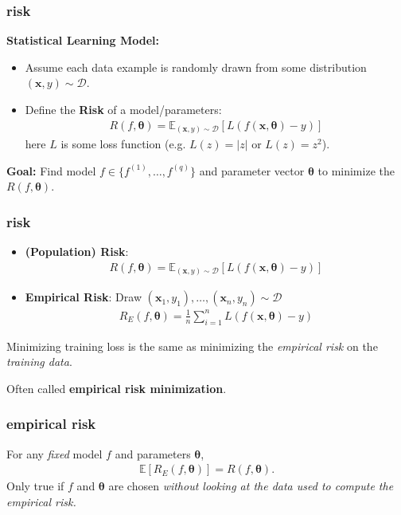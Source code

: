 \documentclass[handout,compress]{beamer}
\newcommand{\bs}[1]{\boldsymbol{#1}}
\newcommand{\bv}[1]{\mathbf{#1}}
\newcommand{\E}{\mathbb{E}}
\begin{document}
\begin{frame}
	\frametitle{risk}
		\textbf{Statistical Learning Model:}
	\begin{itemize}
		\item Assume each data example is randomly drawn from some distribution $(\bv{x},y)\sim \mathcal{D}$.
		\item Define the \alert{\textbf{Risk}} of a model/parameters:
		\begin{align*}
		R(f,\bs{\theta}) = \E_{(\bv{x},y)\sim\mathcal{D}} \left[L\left(f(\bv{x},\bs{\theta}) - y\right) \right]
		\end{align*}
		here $L$ is some loss function (e.g. $L(z) = |z|$ or $L(z) = z^2$).
	\end{itemize}
	
	\begin{center}
		\textbf{Goal:} Find model $f \in \{f^{(1)}, \ldots, f^{(q)}\}$ and parameter vector $\bs{\theta}$ to minimize the $R(f,\bs{\theta})$.
	\end{center}
\end{frame}

\begin{frame}
	\frametitle{risk}
	\begin{itemize}
		\item \textbf{(Population) Risk}: 
		\begin{align*}
			R(f,\bs{\theta}) = \E_{(\bv{x},y)\sim\mathcal{D}} \left[L\left(f(\bv{x},\bs{\theta}) - y\right) \right]
		\end{align*}
		\item \textbf{Empirical Risk}: Draw $(\bv{x}_1,y_1), \ldots, (\bv{x}_n,y_n) \sim\mathcal{D}$
		\begin{align*}
			R_E(f,\bs{\theta}) = \frac{1}{n}\sum_{i=1}^n L\left(f(\bv{x},\bs{\theta}) - y\right)
		\end{align*}
	\end{itemize}
	Minimizing training loss is the same as minimizing the \emph{empirical risk} on the \emph{training data}. 
	
	Often called \alert{\textbf{empirical risk minimization}}.
\end{frame}


\begin{frame}
	\frametitle{empirical risk}
	For any \emph{fixed} model $f$ and parameters $\bs{\theta}$,
	\begin{align*}
		\E\left[R_E(f,\bs{\theta})\right] = R(f,\bs{\theta}).
	\end{align*}
	Only true if $f$ and $\bs{\theta}$ are chosen \textit{without looking at the data used to compute the empirical risk.}
\end{frame}
\end{document}
